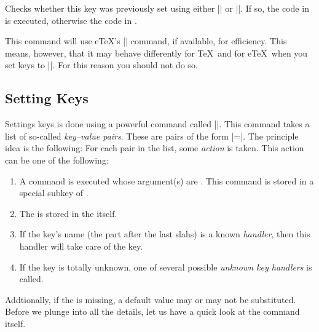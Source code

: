 \begin{command}{\pgfkeysifdefined{}}
  Checks whether this key was previously set using either
  |\pgfkeyssetvalue| or |\pgfkeyslet|. If so, the code in  is
  executed, otherwise the code in .

  This command will use e\TeX's |\ifcsname| command, if available, for
  efficiency. This means, however, that it may behave differently for
  \TeX\ and for e\TeX\ when you set keys to |\relax|. For this reason
  you should not do so. 
\begin{codeexample}[]
\end{codeexample}
\end{command}


\subsection{Setting Keys}

Settings keys is done using a powerful command called |\pgfkeys|. This
command takes a list of so-called \emph{key--value pairs}. These are
pairs of the form |=|. The principle idea is the
following: For each pair in the list, some \emph{action} is
taken. This action can be one of the following:

\begin{enumerate}
\item A command is executed whose argument(s) are . This
  command is stored in a special subkey of .
\item The  is stored in the  itself.
\item If the key's name (the part after the last slahs) is a known
  \emph{handler}, then this handler will take care of the key.
\item If the key is totally unknown, one of several possible
  \emph{unknown key handlers} is called. 
\end{enumerate}

Addtionally, if the  is missing, a default value may or
may not be substituted. Before we plunge into all the details,
let us have a quick look at the command itself.


